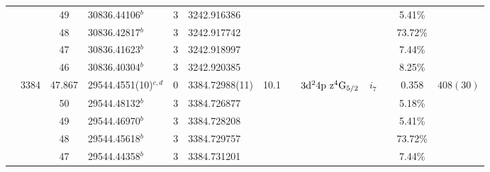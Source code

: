 \begin{table*}
\begin{center}
{\begin{tabular}{:l;l;c;l;c;l;c;l;l;c;c;c;c}
\rowstyle{\itshape}               &        & 49        & 30836.44106$^{b}$                & 3 &   3242.916386      &      & $                                        $ & $                                        $ & $      $ &              & 5.41\%    & $          $\\
\rowstyle{\itshape}               &        & 48        & 30836.42817$^{b}$                & 3 &   3242.917742      &      & $                                        $ & $                                        $ & $      $ &              & 73.72\%   & $          $\\
\rowstyle{\itshape}               &        & 47        & 30836.41623$^{b}$                & 3 &   3242.918997      &      & $                                        $ & $                                        $ & $      $ &              & 7.44\%    & $          $\\
\rowstyle{\itshape}               &        & 46        & 30836.40304$^{b}$                & 3 &   3242.920385      &      & $                                        $ & $                                        $ & $      $ &              & 8.25\%    & $          $\\
                                  & 3384   & 47.867    & 29544.4551(10)$^{c,d}$           & 0 &    3384.72988(11)  & 10.1 & $                                        $ & $3\rm{d}^24\rm{p~z}^4\rm{G}_{5/2}        $ & $i_{7} $ &              & 0.358     & $  408(30) $\\
\rowstyle{\itshape}               &        & 50        & 29544.48132$^{b}$                & 3 &   3384.726877      &      & $                                        $ & $                                        $ & $      $ &              & 5.18\%    & $          $\\
\rowstyle{\itshape}               &        & 49        & 29544.46970$^{b}$                & 3 &   3384.728208      &      & $                                        $ & $                                        $ & $      $ &              & 5.41\%    & $          $\\
\rowstyle{\itshape}               &        & 48        & 29544.45618$^{b}$                & 3 &   3384.729757      &      & $                                        $ & $                                        $ & $      $ &              & 73.72\%   & $          $\\
\rowstyle{\itshape}               &        & 47        & 29544.44358$^{b}$                & 3 &   3384.731201      &      & $                                        $ & $                                        $ & $      $ &              & 7.44\%    & $          $\\

\end{tabular}}
\end{center}
\end{table*}
